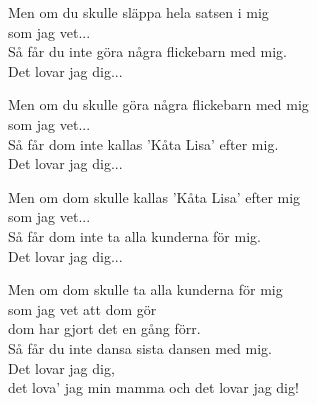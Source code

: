 \vspace{10pt}
Men om du skulle släppa hela satsen i mig\\
som jag vet...\\
Så får du inte göra några flickebarn med mig.\\
Det lovar jag dig...\par
\vspace{10pt}
Men om du skulle göra några flickebarn med mig\\
som jag vet...\\
Så får dom inte kallas 'Kåta Lisa' efter mig.\\
Det lovar jag dig...\par
\vspace{10pt}
Men om dom skulle kallas 'Kåta Lisa' efter mig\\
som jag vet...\\
Så får dom inte ta alla kunderna för mig.\\
Det lovar jag dig...\par
\vspace{10pt}
Men om dom skulle ta alla kunderna för mig\\
som jag vet att dom gör\\
dom har gjort det en gång förr.\\
Så får du inte dansa sista dansen med mig.\\
Det lovar jag dig,\\
det lova' jag min mamma och det lovar jag dig!

